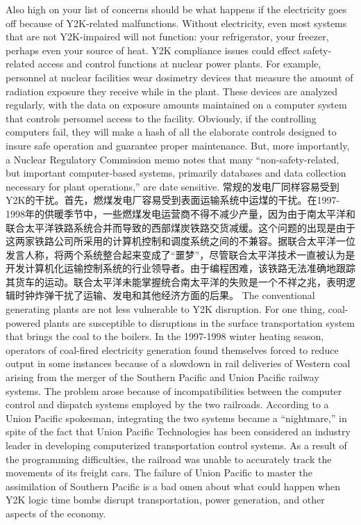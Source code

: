 \begin{paracol}{2}
Also high on your list of concerns should be what happens if the electricity goes off because of Y2K-related malfunctions. Without electricity, even most systems that are not Y2K-impaired will not function: your refrigerator, your freezer, perhaps even your source of heat. Y2K compliance issues could effect safety-related access and control functions at nuclear power plants. For example, personnel at nuclear facilities wear dosimetry devices that measure the amount of radiation exposure they receive while in the plant. These devices are analyzed regularly, with the data on exposure amounts maintained on a computer system that controls personnel access to the facility. Obviously, if the controlling computers fail, they will make a hash of all the elaborate controls designed to insure safe operation and guarantee proper maintenance. But, more importantly, a Nuclear Regulatory Commission memo notes that many ``non-safety-related, but important computer-based systems, primarily databases and data collection necessary for plant operations,'' are date sensitive.
\switchcolumn*
常规的发电厂同样容易受到Y2K的干扰。首先，燃煤发电厂容易受到表面运输系统中运煤的干扰。在1997-1998年的供暖季节中，一些燃煤发电运营商不得不减少产量，因为由于南太平洋和联合太平洋铁路系统合并而导致的西部煤炭铁路交货减缓。这个问题的出现是由于这两家铁路公司所采用的计算机控制和调度系统之间的不兼容。据联合太平洋一位发言人称，将两个系统整合起来变成了“噩梦”，尽管联合太平洋技术一直被认为是开发计算机化运输控制系统的行业领导者。由于编程困难，该铁路无法准确地跟踪其货车的运动。联合太平洋未能掌握统合南太平洋的失败是一个不祥之兆，表明逻辑时钟炸弹干扰了运输、发电和其他经济方面的后果。
\switchcolumn
The conventional generating plants are not less vulnerable to Y2K disruption. For one thing, coal-powered plants are susceptible to disruptions in the surface transportation system that brings the coal to the boilers. In the 1997-1998 winter heating season, operators of coal-fired electricity generation found themselves forced to reduce output in some instances because of a slowdown in rail deliveries of Western coal arising from the merger of the Southern Pacific and Union Pacific railway systems. The problem arose because of incompatibilities between the computer control and dispatch systems employed by the two railroads. According to a Union Pacific spokesman, integrating the two systems became a ``nightmare,'' in spite of the fact that Union Pacific Technologies has been considered an industry leader in developing computerized transportation control systems. As a result of the programming difficulties, the railroad was unable to accurately track the movements of its freight cars. The failure of Union Pacific to master the assimilation of Southern Pacific is a bad omen about what could happen when Y2K logic time bombs disrupt transportation, power generation, and other aspects of the economy.

\end{paracol}
